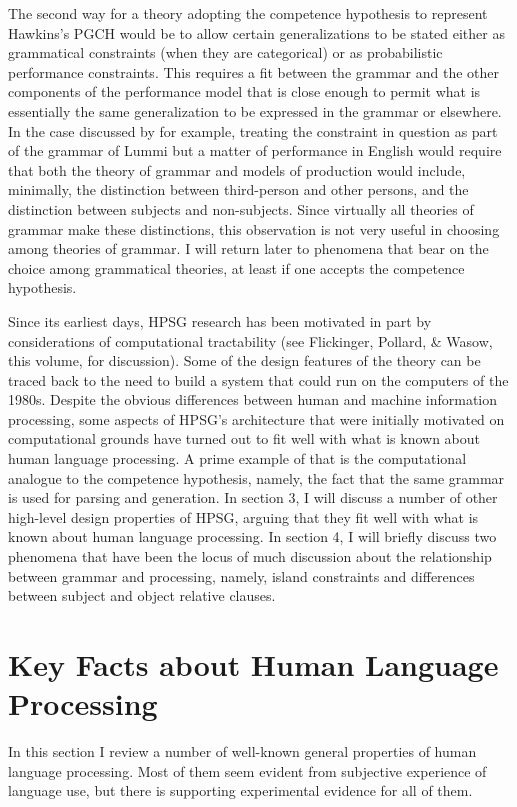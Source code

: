 \documentclass[a4paper]{article}
\begin{document}
The second way for a theory adopting the competence hypothesis to represent Hawkins's PGCH would be to allow certain generalizations to be stated either as grammatical constraints (when they are categorical) or as probabilistic performance constraints.  This requires a fit between the grammar and the other components of the performance model that is close enough to permit what is essentially the same generalization to be expressed in the grammar or elsewhere.  In the case discussed by \citeauthor{BresnanEtAl2001} for example, treating the constraint in question as part of the grammar of Lummi but a matter of performance in English would require that both the theory of grammar and models of production would include, minimally, the distinction between third-person and other persons, and the distinction between subjects and non-subjects.  Since virtually all theories of grammar make these distinctions, this observation is not very useful in choosing among theories of grammar.  I will return later to phenomena that bear on the choice among grammatical theories, at least if one accepts the competence hypothesis.

Since its earliest days, HPSG research has been motivated in part by considerations of computational tractability (see Flickinger, Pollard, \& Wasow, this volume, for discussion).  Some of the design features of the theory can be traced back to the need to build a system that could run on the computers of the 1980s.  Despite the obvious differences between human and machine information processing, some aspects of HPSG's architecture that were initially motivated on computational grounds have turned out to fit well with what is known about human language processing.  A prime example of that is the computational analogue to the competence hypothesis, namely, the fact that the same grammar is used for parsing and generation. In section 3, I will discuss a number of other high-level design properties of HPSG, arguing that they fit well with what is known about human language processing.  In section 4, I will briefly discuss two phenomena that have been the locus of much discussion about the relationship between grammar and processing, namely, island constraints and differences between subject and object relative clauses.

\section{Key Facts about Human Language Processing}

In this section I review a number of well-known general properties of human language processing.  Most of them seem evident from subjective experience of language use, but there is supporting experimental evidence for all of them.  
\end{document}
